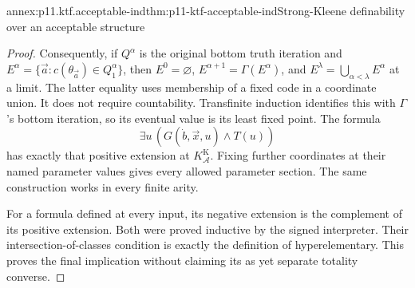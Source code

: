 \begin{annexitem}{annex:p11.ktf.acceptable-ind}{thm:p11-ktf-acceptable-ind}{Strong-Kleene definability over an acceptable structure}
\begin{proof}
Consequently, if \(Q^\alpha\) is the original bottom truth
iteration and \(E^\alpha=\{\vec a:c(\theta_{\vec a})
\in Q^\alpha_1\}\), then
\(E^0=\varnothing\), \(E^{\alpha+1}=\Gamma(E^\alpha)\),
and \(E^\lambda=\bigcup_{\alpha<\lambda}E^\alpha\)
at a limit. The latter equality uses membership of a fixed code
in a coordinate union. It does not require countability. Transfinite
induction identifies this with \(\Gamma\)'s bottom iteration,
so its eventual value is its least fixed point. The formula
\[
 \exists u\,
 (G(\dot b,\vec x,u)\land T(u))
\]
has exactly that positive extension at
\(K_{\mathcal A}^{\mathrm K}\). Fixing further coordinates
at their named parameter values gives every allowed parameter section.
The same construction works in every finite arity.

For a formula defined at every input, its negative extension is
the complement of its positive extension. Both were proved inductive
by the signed interpreter. Their intersection-of-classes condition
is exactly the definition of hyperelementary. This proves the final
implication without claiming its as yet separate totality converse.
\end{proof}
\end{annexitem}

